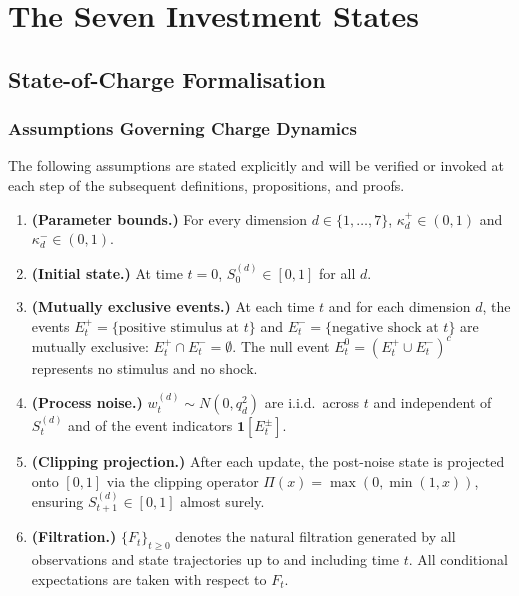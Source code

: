 \documentclass[12pt,openany]{book}
\numberwithin{equation}{chapter}
\theoremstyle{plain}
\theoremstyle{definition}
\theoremstyle{remark}
\def\mathcal#1{#1}%
\begin{document}
\chapter{The Seven Investment States}
\label{ch:seven-states}

\section{State-of-Charge Formalisation}

\subsection{Assumptions Governing Charge Dynamics}
\label{subsec:charge-assumptions}

The following assumptions are stated explicitly and will be
verified or invoked at each step of the subsequent definitions,
propositions, and proofs.

\begin{enumerate}
  \item[\textbf{A1.}] \textbf{(Parameter bounds.)}
    For every dimension $d \in \{1,\ldots,7\}$,
    $\kappa_d^{+} \in (0,1)$ and $\kappa_d^{-} \in (0,1)$.
  \item[\textbf{A2.}] \textbf{(Initial state.)}
    At time $t = 0$, $\mathcal{S}_0^{(d)} \in [0,1]$ for all $d$.
  \item[\textbf{A3.}] \textbf{(Mutually exclusive events.)}
    At each time $t$ and for each dimension $d$, the events
    $E_t^{+} = \{\text{positive stimulus at }t\}$ and
    $E_t^{-} = \{\text{negative shock at }t\}$ are mutually
    exclusive: $E_t^{+} \cap E_t^{-} = \emptyset$.  The null
    event $E_t^{0} = (E_t^{+} \cup E_t^{-})^c$ represents no
    stimulus and no shock.
  \item[\textbf{A4.}] \textbf{(Process noise.)}
    $w_t^{(d)} \sim \mathcal{N}(0, q_d^2)$ are i.i.d.\ across
    $t$ and independent of $\mathcal{S}_t^{(d)}$ and of the
    event indicators $\mathbf{1}[E_t^{\pm}]$.
  \label{rem:projection}
  \item[\textbf{A5.}] \textbf{(Clipping projection.)}
    After each update, the post-noise state is projected onto
    $[0,1]$ via the clipping operator
    $\Pi(x) = \max(0, \min(1, x))$, ensuring
    $\mathcal{S}_{t+1}^{(d)} \in [0,1]$ almost surely.
  \item[\textbf{A6.}] \textbf{(Filtration.)}
    $\{\mathcal{F}_t\}_{t \geq 0}$ denotes the natural filtration
    generated by all observations and state trajectories up to
    and including time $t$.  All conditional expectations are
    taken with respect to $\mathcal{F}_t$.
\end{enumerate}
\end{document}
